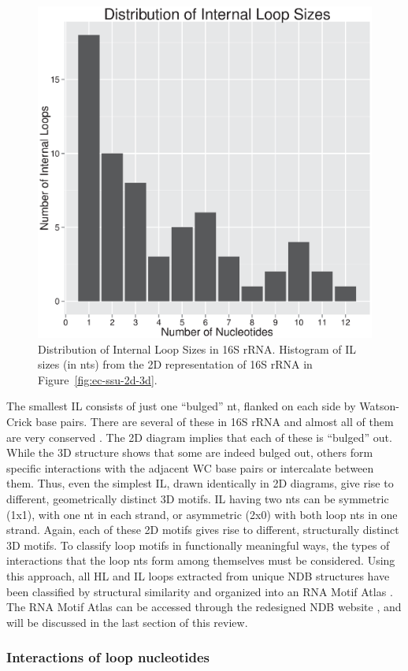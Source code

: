 \begin{figure}
  \includegraphics[width=0.5\linewidth]{chapter-1/figs/il-sizes}
  \caption{Distribution of Internal Loop Sizes in 16S rRNA. Histogram of IL
  sizes (in nts) from the 2D representation of 16S rRNA in
  Figure~\ref{fig:ec-ssu-2d-3d}.}
  \label{fig:ec-il-sizes}
\end{figure}

The smallest IL consists of just one ``bulged'' nt, flanked on each side by
Watson-Crick base pairs. There are several of these in 16S rRNA and almost all
of them are very conserved \cite{Gutell1994}. The 2D diagram implies that each
of these is ``bulged'' out. While the 3D structure shows that some are indeed
bulged out, others form specific interactions with the adjacent WC base pairs or
intercalate between them. Thus, even the simplest IL, drawn identically in 2D
diagrams, give rise to different, geometrically distinct 3D motifs. IL having
two nts can be symmetric (1x1), with one nt in each strand, or asymmetric (2x0)
with both loop nts in one strand. Again, each of these 2D motifs gives rise to
different, structurally distinct 3D motifs. To classify loop motifs in
functionally meaningful ways, the types of interactions that the loop nts form
among themselves must be considered. Using this approach, all HL and IL loops
extracted from unique NDB structures have been classified by structural
similarity and organized into an RNA Motif Atlas \cite{Petrov2013}. The RNA
Motif Atlas can be accessed through the redesigned NDB website
\cite{CoimbatoreNarayanan2014}, and will be discussed in the last section of
this review.

\subsubsection{Interactions of loop nucleotides}

